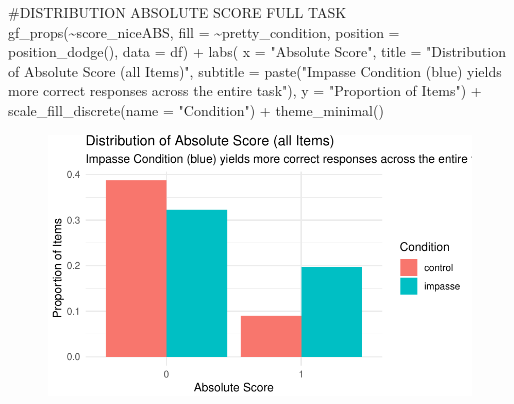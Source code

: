 \documentclass[
  letterpaper,
  DIV=11,
  numbers=noendperiod]{scrreprt}
\newenvironment{Shaded}{\begin{snugshade}}{\end{snugshade}}
\newcommand{\AlertTok}[1]{\textcolor[rgb]{0.68,0.00,0.00}{#1}}
\newcommand{\AttributeTok}[1]{\textcolor[rgb]{0.40,0.45,0.13}{#1}}
\newcommand{\CommentTok}[1]{\textcolor[rgb]{0.37,0.37,0.37}{#1}}
\newcommand{\FunctionTok}[1]{\textcolor[rgb]{0.28,0.35,0.67}{#1}}
\newcommand{\NormalTok}[1]{\textcolor[rgb]{0.00,0.23,0.31}{#1}}
\newcommand{\SpecialCharTok}[1]{\textcolor[rgb]{0.37,0.37,0.37}{#1}}
\newcommand{\StringTok}[1]{\textcolor[rgb]{0.13,0.47,0.30}{#1}}
\begin{document}
\begin{Shaded}
\begin{Highlighting}[]
\CommentTok{\#DISTRIBUTION ABSOLUTE SCORE FULL }\AlertTok{TASK}
\FunctionTok{gf\_props}\NormalTok{(}\SpecialCharTok{\textasciitilde{}}\NormalTok{score\_niceABS, }\AttributeTok{fill =} \SpecialCharTok{\textasciitilde{}}\NormalTok{pretty\_condition, }\AttributeTok{position =} \FunctionTok{position\_dodge}\NormalTok{(), }\AttributeTok{data =}\NormalTok{ df) }\SpecialCharTok{+}
  \FunctionTok{labs}\NormalTok{( }\AttributeTok{x =} \StringTok{"Absolute Score"}\NormalTok{, }
        \AttributeTok{title =} \StringTok{"Distribution of Absolute Score (all Items)"}\NormalTok{,}
        \AttributeTok{subtitle =} \FunctionTok{paste}\NormalTok{(}\StringTok{"Impasse Condition (blue) yields more correct responses across the entire task"}\NormalTok{),}
        \AttributeTok{y =} \StringTok{"Proportion of Items"}\NormalTok{) }\SpecialCharTok{+}
  \FunctionTok{scale\_fill\_discrete}\NormalTok{(}\AttributeTok{name =} \StringTok{"Condition"}\NormalTok{) }\SpecialCharTok{+}  
  \FunctionTok{theme\_minimal}\NormalTok{()}
\end{Highlighting}
\end{Shaded}

\begin{figure}[H]

{\centering \includegraphics{analysis/SGC3A/2_sgc3A_scoring_files/figure-pdf/DISTR-ABSCORE-1.pdf}

}

\end{figure}
\end{document}

